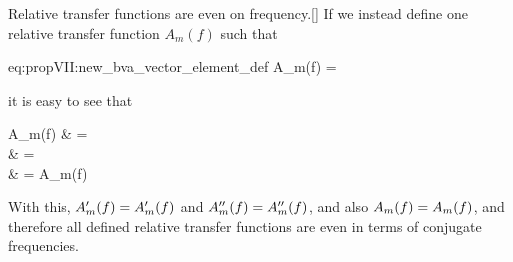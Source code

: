 \begin{Property}{Relative transfer functions are even on frequency.}[\label{prop:rtfs_are_even-func_of_frequency}]
	If we instead define one relative transfer function $A_m(f)$ such that
	\begin{equations}{eq:propVII:new_bva_vector_element_def}
		A_m(f) = 
	\end{equations}
	it is easy to see that
	\begin{equations}
		A_m(\-f)
		& =  \\
		& =  \\
		& = A_m(f)
	\end{equations}
	
	With this, $A_m'(f) = A_m'(\-f)$ and $A_m''(f) = A_m''(\-f)$, and also $A_m(f) = A_m(\-f)$, and therefore all defined relative transfer functions are even in terms of conjugate frequencies.
	
\end{Property}